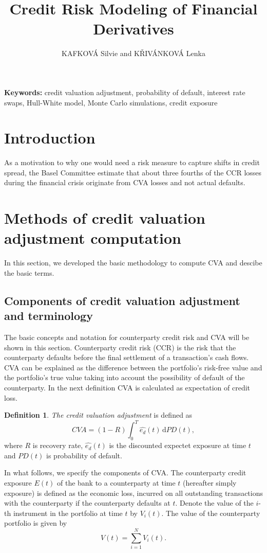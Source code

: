 \documentclass{amsart}
\theoremstyle{definition}\newtheorem{definition}[theorem]{Definition}
\theoremstyle{remark}\newtheorem{remark}[theorem]{Remark}
\newcommand{\dif}{\,\mathrm{d}}
\begin{document}
\title{Credit Risk Modeling of Financial Derivatives}
\author{KAFKOVÁ Silvie and KŘIVÁNKOVÁ Lenka}

\begin{abstract}
\end{abstract}
\maketitle

\noindent\textbf{Keywords:} credit valuation adjustment, probability of default, interest rate swaps, Hull-White model, Monte Carlo simulations, credit exposure

\bigskip

\section{Introduction}
As a motivation to why one would need a risk measure to capture shifts in credit spread, the Basel Committee estimate that about three fourths of the CCR losses during the financial crisis originate from CVA losses and not actual defaults.

\section{Methods of credit valuation adjustment computation}
In this section, we developed the basic methodology to compute CVA and descibe the basic terms.

\subsection{Components of credit valuation adjustment and terminology}
The basic concepts and notation for counterparty credit risk and CVA will be shown in this section.
Counterparty credit risk (CCR) is the risk that the counterparty defaults before the final settlement of a transaction's cash flows.
CVA can be explained as the difference between the portfolio’s risk-free value and the portfolio’s true value taking into account the possibility of default of the counterparty.
In the next definition CVA is calculated as expectation of credit loss.
\begin{definition}
 \textit{The credit valuation adjustment} is defined as
 \begin{equation}
 CVA=(1-R)\int_{0}^T \hat{e_d}(t)\dif PD(t),
 \label{CVA}
\end{equation}
  where $R$ is recovery rate, $\hat{e_d}(t)$ is the discounted expectet exposure at time $t$ and $PD(t)$ is probability of default.
\end{definition}
In what follows, we specify the components of CVA. 
The counterparty credit exposure $E(t)$ of the bank to a counterparty at time $t$ (hereafter simply exposure) is defined as the economic loss, incurred on all outstanding transactions with the counterparty if the counterparty defaults at $t$.
Denote the value of the $i$-th instrument in the portfolio at time $t$ by  $V_i(t)$. 
The value of the counterparty portfolio is given by 
\begin{equation}
V(t)=\sum_{i=1}^N V_i(t).
\end{equation}
\end{document}
